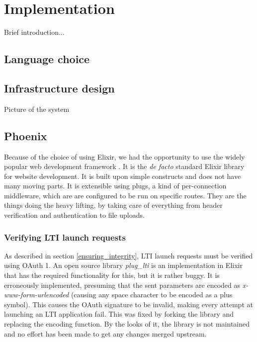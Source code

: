 \chapter{Implementation}

Brief introduction...

\section{Language choice}



\section{Infrastructure design}

Picture of the system

\section{Phoenix}

Because of the choice of using Elixir, we had the opportunity to use the widely popular web development framework \cite{2018Phoenix}. It is the \emph{de facto} standard Elixir library for website development. It is built upon simple constructs and does not have many moving parts. It is extensible using plugs, a kind of per-connection middleware, which are are configured to be run on specific routes. They are the things doing the heavy lifting, by taking care of everything from header verification and authentication to file uploads.

\subsection{Verifying LTI launch requests}

As described in section \ref{ensuring_integrity}, LTI launch requests must be verified using OAuth 1. An open source library \emph{plug\_lti} is an implementation in Elixir that has the required functionality for this, but it is rather buggy. It is erroneously implemented, presuming that the sent parameters are encoded as \emph{x-www-form-urlencoded} (causing any space character to be encoded as a plus symbol). This causes the OAuth signature to be invalid, making every attempt at launching an LTI application fail. This was fixed by forking the library and replacing the encoding function. By the looks of it, the library is not maintained and no effort has been made to get any changes merged upstream.

